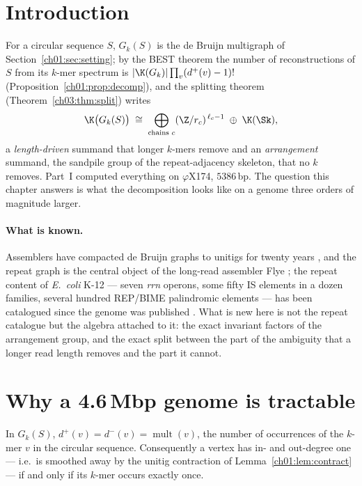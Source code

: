 \section{Introduction}\label{ch15:sec:intro}

For a circular sequence $S$, $G_k(S)$ is the de Bruijn multigraph of
Section~\ref{ch01:sec:setting}; by the BEST theorem the number of reconstructions of $S$ from its
$k$-mer spectrum is $|\K(G_k)|\prod_v(d^{+}(v)-1)!$ (Proposition~\ref{ch01:prop:decomp}), and the
splitting theorem (Theorem~\ref{ch03:thm:split}) writes
\[
\K\bigl(G_k(S)\bigr)\;\cong\;\bigoplus_{\text{chains }c}(\Z/r_c)^{\,\ell_c-1}
\;\oplus\;\K(\Sk),
\]
a \emph{length-driven} summand that longer $k$-mers remove and an \emph{arrangement}
summand, the sandpile group of the repeat-adjacency skeleton, that no $k$ removes.
Part~I computed everything on $\varphi$X174, $5386$\,bp. The question this chapter
answers is what the decomposition looks like on a genome three orders of magnitude
larger.

\paragraph{What is known.} Assemblers have compacted de Bruijn graphs to unitigs for
twenty years \cite{PTW,KM,BCALM}, and the repeat graph is the central object of the
long-read assembler Flye \cite{PTT,Flye}; the repeat content of \emph{E.\ coli} K-12 ---
seven \emph{rrn} operons, some fifty IS elements in a dozen families, several hundred
REP/BIME palindromic elements --- has been catalogued since the genome was published
\cite{Blattner}. What is new here is not the repeat catalogue but the algebra attached to
it: the exact invariant factors of the arrangement group, and the exact split between the
part of the ambiguity that a longer read length removes and the part it cannot.

\section{\texorpdfstring{Why a 4.6\,Mbp genome is tractable}{Why a 4.6 Mbp genome is tractable}}\label{ch15:sec:scaling}

\begin{lemma}\label{ch15:lem:branch}
In $G_k(S)$, $d^{+}(v)=d^{-}(v)=\operatorname{mult}(v)$, the number of occurrences of the
$k$-mer $v$ in the circular sequence. Consequently a vertex has in- and out-degree one
--- i.e.\ is smoothed away by the unitig contraction of Lemma~\ref{ch01:lem:contract} --- if and
only if its $k$-mer occurs exactly once.
\end{lemma}

